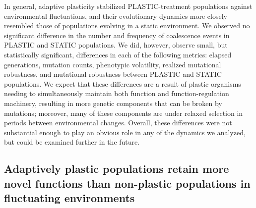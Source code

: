 \begin{raggedbottom}
In general, adaptive plasticity stabilized PLASTIC-treatment populations against environmental fluctuations, and their evolutionary dynamics more closely resembled those of populations evolving in a static environment.
We observed no significant difference in the number and frequency of coalescence events in PLASTIC and STATIC populations.
We did, however, observe small, but statistically significant, differences in each of the following metrics: elapsed generations,  mutation counts, phenotypic volatility, realized mutational robustness, and mutational robustness between PLASTIC and STATIC populations.  
We expect that these differences are a result of plastic organisms needing to simultaneously maintain both function and function-regulation machinery, resulting in more genetic components that can be broken by mutations; moreover, many of these components are under relaxed selection in periods between environmental changes.
Overall, these differences were not substantial enough to play an obvious role in any of the dynamics we analyzed, but could be examined further in the future.

\subsection{Adaptively plastic populations retain more novel functions than non-plastic populations in fluctuating environments}




\end{raggedbottom}
